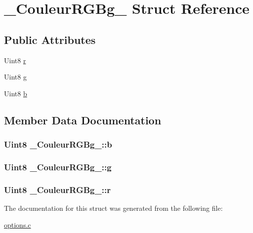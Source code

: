 \hypertarget{struct__CouleurRGBg__}{}\section{\+\_\+\+Couleur\+R\+G\+Bg\+\_\+ Struct Reference}
\label{struct__CouleurRGBg__}
\subsection*{Public Attributes}
\begin{DoxyCompactItemize}
\item 
Uint8 \hyperlink{struct__CouleurRGBg___a78637edb967962efad62bc43d6438dd7}{r}
\item 
Uint8 \hyperlink{struct__CouleurRGBg___a25ae1d0bfe8aea8aff118aff66be1a0e}{g}
\item 
Uint8 \hyperlink{struct__CouleurRGBg___a139a29be9ccb5fac1a3505fc8af081b9}{b}
\end{DoxyCompactItemize}


\subsection{Member Data Documentation}
\subsubsection[{\texorpdfstring{b}{b}}]{\setlength{\rightskip}{0pt plus 5cm}Uint8 \+\_\+\+Couleur\+R\+G\+Bg\+\_\+\+::b}\hypertarget{struct__CouleurRGBg___a139a29be9ccb5fac1a3505fc8af081b9}{}\label{struct__CouleurRGBg___a139a29be9ccb5fac1a3505fc8af081b9}
\subsubsection[{\texorpdfstring{g}{g}}]{\setlength{\rightskip}{0pt plus 5cm}Uint8 \+\_\+\+Couleur\+R\+G\+Bg\+\_\+\+::g}\hypertarget{struct__CouleurRGBg___a25ae1d0bfe8aea8aff118aff66be1a0e}{}\label{struct__CouleurRGBg___a25ae1d0bfe8aea8aff118aff66be1a0e}
\subsubsection[{\texorpdfstring{r}{r}}]{\setlength{\rightskip}{0pt plus 5cm}Uint8 \+\_\+\+Couleur\+R\+G\+Bg\+\_\+\+::r}\hypertarget{struct__CouleurRGBg___a78637edb967962efad62bc43d6438dd7}{}\label{struct__CouleurRGBg___a78637edb967962efad62bc43d6438dd7}


The documentation for this struct was generated from the following file\+:\begin{DoxyCompactItemize}
\item 
\hyperlink{options_8c}{options.\+c}\end{DoxyCompactItemize}
